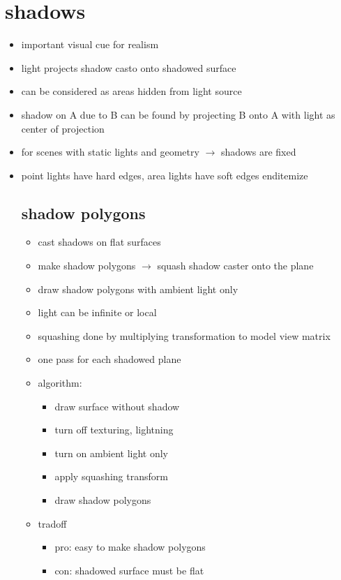 \documentclass[11pt,a4paper]{article}
\begin{document}
\section{shadows}
\begin{itemize}
	\item important visual cue for realism
	\item light projects shadow casto onto shadowed surface
	\item can be considered as areas hidden from light source
	\item shadow on A due to B can be found by projecting B onto A with light as center of projection
	\item for scenes with static lights and geometry $\rightarrow$ shadows are fixed
	\item point lights have hard edges, area lights have soft edges
end{itemize}
\subsection{shadow polygons}
\begin{itemize}
	\item cast shadows on flat surfaces
	\item make shadow polygons $\rightarrow$ squash shadow caster onto the plane
	\item draw shadow polygons with ambient light only
	\item light can be infinite or local
	\item squashing done by multiplying transformation to model view matrix
	\item one pass for each shadowed plane
	\item algorithm:
	\begin{itemize}
		\item draw surface without shadow
		\item turn off texturing, lightning
		\item turn on ambient light only
		\item apply squashing transform
		\item draw shadow polygons
	\end{itemize}
	\item tradoff
	\begin{itemize}
		\item pro: easy to make shadow polygons
		\item con: shadowed surface must be flat
	\end{itemize}
\end{itemize}
\end{itemize}
\end{document}
